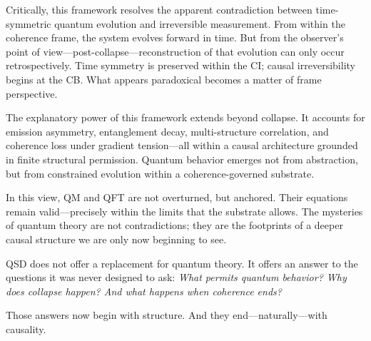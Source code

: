\documentclass[entropy,article,submit,pdftex,moreauthors]{Definitions/mdpi}
\begin{document}
Critically, this framework resolves the apparent contradiction between time-symmetric quantum evolution and irreversible measurement. From within the coherence frame, the system evolves forward in time. But from the observer’s point of view—post-collapse—reconstruction of that evolution can only occur retrospectively. Time symmetry is preserved within the CI; causal irreversibility begins at the CB. What appears paradoxical becomes a matter of frame perspective.

The explanatory power of this framework extends beyond collapse. It accounts for emission asymmetry, entanglement decay, multi-structure correlation, and coherence loss under gradient tension—all within a causal architecture grounded in finite structural permission. Quantum behavior emerges not from abstraction, but from constrained evolution within a coherence-governed substrate.

In this view, QM and QFT are not overturned, but anchored. Their equations remain valid—precisely within the limits that the substrate allows. The mysteries of quantum theory are not contradictions; they are the footprints of a deeper causal structure we are only now beginning to see.

\smallskip

QSD does not offer a replacement for quantum theory. It offers an answer to the questions it was never designed to ask:  
\textit{What permits quantum behavior?  
Why does collapse happen?  
And what happens when coherence ends?}

Those answers now begin with structure. And they end—naturally—with causality.


\vspace{6pt} 



\end{document}
